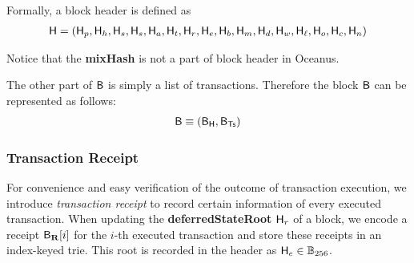 Formally, a block header is defined as 
%
\begin{align}
	\textsf{H} = (\textsf{H}_p,\textsf{H}_h,\textsf{H}_s,\textsf{H}_s,\textsf{H}_a,\textsf{H}_t,\textsf{H}_r,\textsf{H}_e,\textsf{H}_b,\textsf{H}_m,\textsf{H}_d,\textsf{H}_w,\textsf{H}_\ell,\textsf{H}_o,\textsf{H}_c,\textsf{H}_n)
\end{align}

Notice that the {\bf mixHash} is not a part of block header in Oceanus. 
	
The other part of $\textsf{B}$ is simply a list of transactions. Therefore the block $\textsf{B}$ can be represented as follows:
\begin{align}
	\textsf{B}\equiv \left(\textsf{B}_{\textsf{H}}, \textsf{B}_{\textsf{Ts}} \right)
\end{align}


\subsubsection{Transaction Receipt}

For convenience and easy verification of the outcome of transaction execution, 
we introduce \emph{transaction receipt} to record certain information of every executed transaction.
When updating the {\bf deferredStateRoot} $\textsf{H}_r$ of a block,
we encode a receipt $\textsf{B}_{\mathbf{R}}[i]$ for the $i$-th executed transaction
and store these receipts in an index-keyed trie.
This root is recorded in the header as $\textsf{H}_e\in\mathbb{B}_{256}$.


